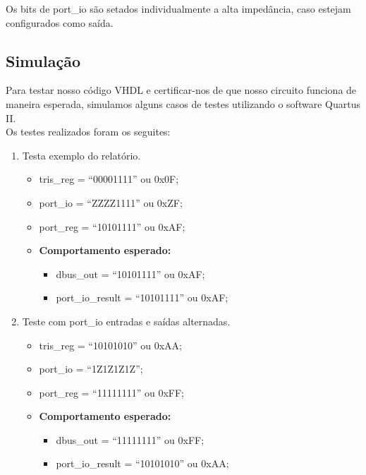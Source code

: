 \documentclass{article}
\begin{document}
Os bits de port\_io são setados individualmente a alta impedância, caso estejam configurados como saída.

\subsection{Simulação}

Para testar nosso código VHDL e certificar-nos de que nosso circuito funciona de maneira esperada, simulamos alguns casos de testes utilizando o software Quartus II.\\

Os testes realizados foram os seguites:

\begin{enumerate}
    \item Testa exemplo do relatório.
    \begin{itemize}
        \item tris\_reg = ``00001111'' ou 0x0F;
        \item port\_io  = ``ZZZZ1111'' ou 0xZF;
        \item port\_reg = ``10101111'' ou 0xAF;
        \item \textbf{Comportamento esperado:}
        \begin{itemize}
            \item dbus\_out = ``10101111'' ou 0xAF;
            \item port\_io\_result =  ``10101111'' ou 0xAF;
        \end{itemize}
    \end{itemize}

    \item Teste com port\_io entradas e saídas alternadas.
    \begin{itemize}
        \item tris\_reg = ``10101010'' ou 0xAA;
        \item port\_io  = ``1Z1Z1Z1Z'';
        \item port\_reg = ``11111111'' ou 0xFF;
        \item \textbf{Comportamento esperado:}
        \begin{itemize}
            \item dbus\_out = ``11111111'' ou 0xFF;
            \item port\_io\_result =  ``10101010'' ou 0xAA;
        \end{itemize}
    \end{itemize}


\end{enumerate}
\end{document}
